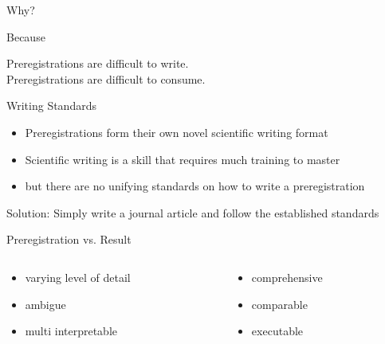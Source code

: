\documentclass[12pt,t]{beamer}
\begin{document}
\begin{frame}[c]
  \begin{center}
    \Huge \textcolor{hilit}{Why?}
  \end{center}
\end{frame}

\begin{frame}[c]{Because}
  \begin{center}
    \Large {} Preregistrations are difficult to \textcolor{hilit}{write}.\\
    \Large {} Preregistrations are difficult to \textcolor{vhilit}{consume}.
  \end{center}
\end{frame}

\begin{frame}{Writing Standards}
  \begin{itemize}
    \item Preregistrations form their own novel scientific writing format
    \item Scientific writing is a skill that requires much training to master
    \item but there are no unifying standards on how to write a preregistration
  \end{itemize}
  \vspace{10mm}
  Solution: Simply write a journal article and follow the \textcolor{hilit}{established standards}
\end{frame}

\begin{frame}[c]{Preregistration vs. Result}
\begin{columns}
\begin{column}{0.5\textwidth}
  \centering{\textcolor{vhilit}{Natural Language}}
  \begin{itemize}
    \item varying level of detail
    \item ambigue
    \item multi interpretable
  \end{itemize}
\end{column}
\begin{column}{0.5\textwidth}
\centering{\textcolor{hilit}{Computer Code}}
  \begin{itemize}
    \item comprehensive
    \item comparable
    \item executable
  \end{itemize}
\end{column}
\end{columns}
\end{frame}
\end{document}
